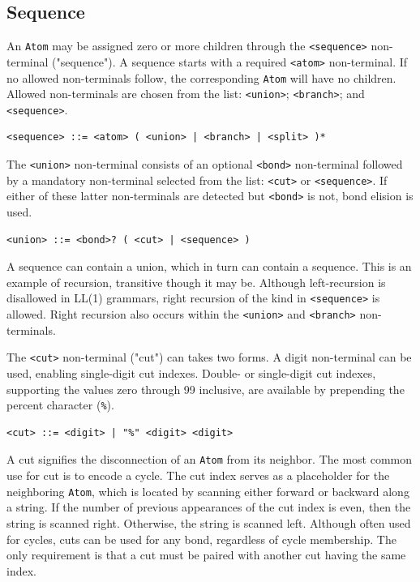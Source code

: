 \documentclass{article}
\def\ttt{\texttt}
\begin{document}
\subsection*{Sequence}

An \ttt{Atom} may be assigned zero or more children through the \ttt{<sequence>} non-terminal ("sequence"). A sequence starts with a required \ttt{<atom>} non-terminal. If no allowed non-terminals follow, the corresponding \ttt{Atom} will have no children. Allowed non-terminals are chosen from the list: \ttt{<union>}; \ttt{<branch>}; and \ttt{<sequence>}.

\begin{lstlisting}
<sequence> ::= <atom> ( <union> | <branch> | <split> )*
\end{lstlisting}

The \ttt{<union>} non-terminal consists of an optional \ttt{<bond>} non-terminal followed by a mandatory non-terminal selected from the list: \ttt{<cut>} or \ttt{<sequence>}. If either of these latter non-terminals are detected but \ttt{<bond>} is not, bond elision is used.

\begin{lstlisting}
<union> ::= <bond>? ( <cut> | <sequence> )
\end{lstlisting}

A sequence can contain a union, which in turn can contain a sequence. This is an example of recursion, transitive though it may be. Although left-recursion is disallowed in LL(1) grammars, right recursion of the kind in \ttt{<sequence>} is allowed. Right recursion also occurs within the \ttt{<union>} and \ttt{<branch>} non-terminals.

The \ttt{<cut>} non-terminal ("cut") can takes two forms. A digit non-terminal can be used, enabling single-digit cut indexes. Double- or single-digit cut indexes, supporting the values zero through 99 inclusive, are available by prepending the percent character (\ttt{\%}).

\begin{lstlisting}
<cut> ::= <digit> | "%" <digit> <digit>
\end{lstlisting}

A cut signifies the disconnection of an \ttt{Atom} from its neighbor. The most common use for cut is to encode a cycle. The cut index serves as a placeholder for the neighboring \ttt{Atom}, which is located by scanning either forward or backward along a string. If the number of previous appearances of the cut index is even, then the string is scanned right. Otherwise, the string is scanned left. Although often used for cycles, cuts can be used for any bond, regardless of cycle membership. The only requirement is that a cut must be paired with another cut having the same index.
\end{document}
